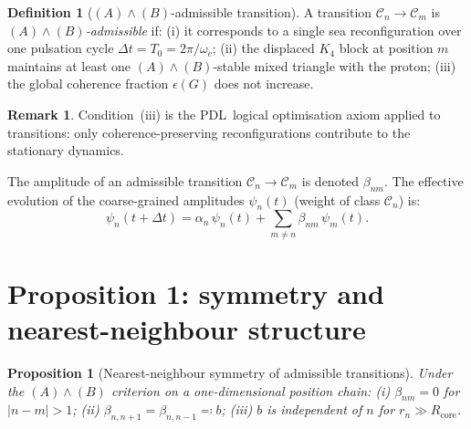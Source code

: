 \documentclass[11pt,a4paper]{article}
\newtheorem{proposition}[theorem]{Proposition}
\theoremstyle{definition}
\newtheorem{definition}[theorem]{Definition}
\newtheorem{remark}[theorem]{Remark}
\newcommand{\PDL}{\textnormal{PDL}}
\begin{document}
\begin{definition}[$(A)\wedge(B)$-admissible transition]
\label{def:admissible}
A transition $\mathcal{C}_n\to\mathcal{C}_m$ is \emph{$(A)\wedge(B)$-admissible} if: (i) it corresponds to a single sea reconfiguration over one pulsation cycle $\Delta t = T_0 = 2\pi/\omega_c$; (ii) the displaced $K_4$ block at position $m$ maintains at least one $(A)\wedge(B)$-stable mixed triangle with the proton; (iii) the global coherence fraction $\epsilon(G)$ does not increase.
\end{definition}

\begin{remark}
Condition~(iii) is the \PDL\ logical optimisation axiom applied to transitions: only coherence-preserving reconfigurations contribute to the stationary dynamics.
\end{remark}

The amplitude of an admissible transition $\mathcal{C}_n\to\mathcal{C}_m$ is denoted $\beta_{nm}$. The effective evolution of the coarse-grained amplitudes $\psi_n(t)$ (weight of class $\mathcal{C}_n$) is:
\begin{equation}
\psi_n(t+\Delta t) = \alpha_n\,\psi_n(t) + \sum_{m\neq n}\beta_{nm}\,\psi_m(t).
\label{eq:update_general}
\end{equation}

\section{Proposition 1: symmetry and nearest-neighbour structure}
\label{sec:P1}

\begin{proposition}[Nearest-neighbour symmetry of admissible transitions]
\label{prop:P1}
Under the $(A)\wedge(B)$ criterion on a one-dimensional position chain: (i) $\beta_{nm} = 0$ for $|n-m|>1$; (ii) $\beta_{n,n+1} = \beta_{n,n-1} \eqqcolon b$; (iii) $b$ is independent of $n$ for $r_n \gg R_{\mathrm{core}}$.
\end{proposition}
\end{document}
